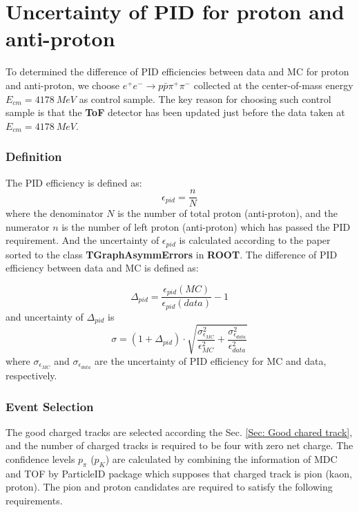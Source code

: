\section{Uncertainty of PID for proton and anti-proton}
\label{Sec: PID}
To determined the difference of PID efficiencies between data and MC
for proton and anti-proton, we choose $e^{+} e^{-} \rightarrow p
\bar{p} \pi^{+} \pi^{-}$ collected at the center-of-mass energy $E_{cm}
= 4178~MeV$ as control sample. The key reason for choosing such control
sample is that the \textbf{ToF} detector has been updated just before the data
taken at $E_{cm}=4178 ~MeV$.
\subsubsection*{Definition}
The PID efficiency is defined as:
\begin{equation}
    \epsilon_{pid} = \frac{n}{N}
\end{equation}
where the denominator $N$ is the number of total proton (anti-proton),
and the numerator $n$ is the number of left proton (anti-proton) which
has passed the PID requirement. And the uncertainty of $\epsilon_{pid}$
is calculated according to the paper \cite{brown2001interval} sorted to
the class \textbf{TGraphAsymmErrors} in \textbf{ROOT}. The difference
of PID efficiency between data and MC is defined as: 

\begin{equation}
    \Delta _{pid} = \frac{\epsilon_{pid}(MC)}{\epsilon_{pid}(data)} - 1
\end{equation}
and uncertainty of $\Delta_{pid}$ is
\begin{equation}
    \sigma = (1+ \Delta_{pid})\cdot
    \sqrt{\frac{\sigma^{2}_{\epsilon_{MC}}}{\epsilon^{2}_{MC}} +
    \frac{\sigma^{2}_{\epsilon_{data}}}{\epsilon^{2}_{data}}}
\end{equation}
where $\sigma_{\epsilon_{MC}}$ and $\sigma_{\epsilon_{data}}$ are the uncertainty of PID efficiency for MC and data, respectively.

\subsubsection{Event Selection}
The good charged tracks are selected according the Sec. \ref{Sec:
Good chared track}, and the number of charged tracks is required to
be four with zero net charge. The confidence levels $p_{\pi}$
($p_{K}$) are calculated by combining the information of MDC and
TOF by ParticleID package which supposes that charged track is pion
(kaon, proton). The pion and proton candidates are required to
satisfy the following requirements.  

